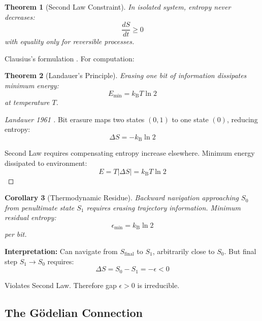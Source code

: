 \documentclass[twocolumn,10pt]{revtex4-2}
\newtheorem{theorem}{Theorem}[section]
\newtheorem{corollary}[theorem]{Corollary}
\theoremstyle{definition}
\theoremstyle{remark}
\newcommand{\kB}{k_{\mathrm{B}}}
\begin{document}
\begin{theorem}[Second Law Constraint]
\label{thm:second_law}
In isolated system, entropy never decreases:
\begin{equation}
\frac{dS}{dt} \geq 0
\end{equation}
with equality only for reversible processes.
\end{theorem}

\noindent Clausius's formulation \cite{Clausius1865}. For computation:

\begin{theorem}[Landauer's Principle]
\label{thm:landauer}
Erasing one bit of information dissipates minimum energy:
\begin{equation}
E_{\min} = \kB T \ln 2
\end{equation}
at temperature $T$.
\end{theorem}

\begin{proof}[Landauer 1961 \cite{Landauer1961}]
Bit erasure maps two states $(0,1)$ to one state $(0)$, reducing entropy:
\begin{equation}
\Delta S = -\kB \ln 2
\end{equation}

Second Law requires compensating entropy increase elsewhere. Minimum energy dissipated to environment:
\begin{equation}
E = T |\Delta S| = \kB T \ln 2
\end{equation}
\end{proof}

\begin{corollary}[Thermodynamic Residue]
\label{cor:residue}
Backward navigation approaching $S_0$ from penultimate state $S_1$ requires erasing trajectory information. Minimum residual entropy:
\begin{equation}
\epsilon_{\min} = \kB \ln 2
\end{equation}
per bit.
\end{corollary}

\vspace{0.2cm}
\noindent\textbf{Interpretation:} Can navigate from $S_{\text{final}}$ to $S_1$, arbitrarily close to $S_0$. But final step $S_1 \to S_0$ requires:
\begin{equation}
\Delta S = S_0 - S_1 = -\epsilon < 0
\end{equation}

Violates Second Law. Therefore gap $\epsilon > 0$ is irreducible.

\subsection{The Gödelian Connection}
\end{document}

